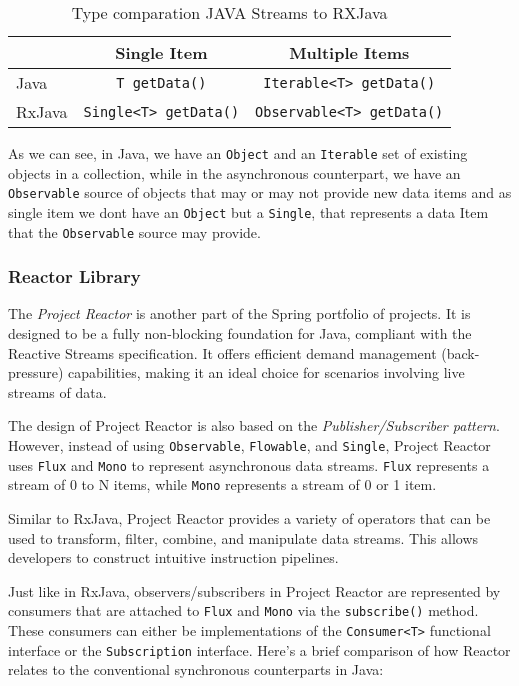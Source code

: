 \begin{table}[h]
	\centering
	\begin{tabular}{|l|c|c|}
	\hline
	& Single Item & Multiple Items \\ 
	\hline
	Java & \texttt{T getData()} & \texttt{Iterable<T> getData()} \\ 
	\hline
	RxJava & \texttt{Single<T> getData()} & \texttt{Observable<T> getData()} \\ 
	\hline
	\end{tabular}
	\caption{Type comparation JAVA Streams to RXJava}
	\label{tab:my_table}
\end{table}

As we can see, in Java, we have an \texttt{Object} and an \texttt{Iterable} set of existing objects in a collection, while in the asynchronous counterpart, we have an \texttt{Observable} source of objects that may or may not provide new data items and as single item we dont have an \texttt{Object} but a \texttt{Single}, that represents a data Item that the \texttt{Observable} source may provide.

\subsubsection{Reactor Library}
\label{sec:reactor_architecture}

The \textit{Project Reactor} is another part of the Spring portfolio of projects. It is designed to be a fully non-blocking foundation for Java, compliant with the Reactive Streams specification. It offers efficient demand management (back-pressure) capabilities, making it an ideal choice for scenarios involving live streams of data.

The design of Project Reactor is also based on the \textit{Publisher/Subscriber pattern}. However, instead of using \texttt{Observable}, \texttt{Flowable}, and \texttt{Single}, Project Reactor uses \texttt{Flux} and \texttt{Mono} to represent asynchronous data streams. \texttt{Flux} represents a stream of 0 to N items, while \texttt{Mono} represents a stream of 0 or 1 item.

Similar to RxJava, Project Reactor provides a variety of operators that can be used to transform, filter, combine, and manipulate data streams. This allows developers to construct intuitive instruction pipelines. 

Just like in RxJava, observers/subscribers in Project Reactor are represented by consumers that are attached to \texttt{Flux} and \texttt{Mono} via the \texttt{subscribe()} method. These consumers can either be implementations of the \texttt{Consumer<T>} functional interface or the \texttt{Subscription} interface. 
Here's a brief comparison of how Reactor relates to the conventional synchronous counterparts in Java:

